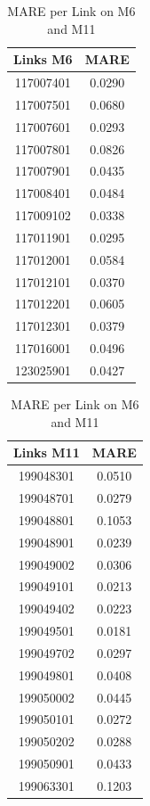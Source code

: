 \documentclass[a4paper, 10pt, conference]{ieeeconf}      %
\begin{document}
\begin{table}[htbp]
	\caption{MARE per Link on M6 and M11}
	\begin{center}
		\begin{tabular}{|c|c|}
			\hline
			\textbf{Links M6}&{\textbf{MARE}} \\
			\hline
			117007401& 0.0290\\
			\hline
			117007501& 0.0680\\
			\hline
			117007601& 0.0293\\
			\hline
			117007801& 0.0826\\
			\hline
			117007901& 0.0435\\
			\hline
			117008401& 0.0484\\
			\hline
			117009102& 0.0338\\
			\hline
			117011901& 0.0295\\
			\hline
			117012001& 0.0584\\
			\hline
			117012101& 0.0370\\
			\hline
			117012201& 0.0605\\
			\hline
			117012301& 0.0379\\
			\hline
			117016001& 0.0496\\
			\hline
			123025901& 0.0427\\
			\hline
		\end{tabular}
		\quad
		\begin{tabular}{|c|c|}
			\hline
			\textbf{Links M11}&{\textbf{MARE}} \\
			\hline
			199048301& 0.0510\\
			\hline
			199048701& 0.0279\\
			\hline
			199048801& 0.1053\\
			\hline
			199048901& 0.0239\\
			\hline
			199049002& 0.0306\\
			\hline
			199049101& 0.0213\\
			\hline
			199049402& 0.0223\\
			\hline
			199049501& 0.0181\\
			\hline
			199049702& 0.0297\\
			\hline
			199049801& 0.0408\\
			\hline
			199050002& 0.0445\\
			\hline
			199050101& 0.0272\\
			\hline
			199050202& 0.0288\\
			\hline
			199050901& 0.0433\\
			\hline
			199063301& 0.1203\\

\end{tabular}
\end{center}
\end{table}
\end{document}
